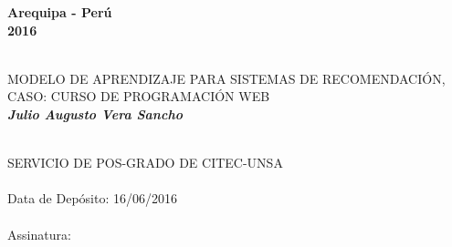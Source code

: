 \begin{titlepage}
\begin{center}
\begin{flushright}
\end{flushright}

\vspace*{2.5cm}
\begin{center}
\small
\textbf{Arequipa - Perú \\2016}
\end{center}
\cleardoublepage


\newpage





\vfill

\vspace*{5cm}

\begin{center}
\begin{minipage}[c]{12cm}
\begin{center}
\hrulefill\\
\vspace{.5cm} {\Large MODELO DE APRENDIZAJE PARA SISTEMAS DE RECOMENDACIÓN, CASO: CURSO DE PROGRAMACIÓN WEB}\\
\vspace{1.3cm}
\small\textbf{\it Julio Augusto Vera Sancho}\\
\vspace{.5cm}
\hrulefill\\
\end{center}
\end{minipage}
\end{center}

\vfill





\vspace*{10cm}
\begin{flushright}
\begin{Sbox}
\begin{minipage}{8.5cm}
\footnotesize
SERVICIO DE  POS-GRADO DE CITEC-UNSA\\
\\
Data de Depósito:    16/06/2016\\
\\
Assinatura:\hrulefill
\end{minipage}
\end{Sbox}
\fbox{\TheSbox}
\end{flushright}






\end{center}
\end{titlepage}
